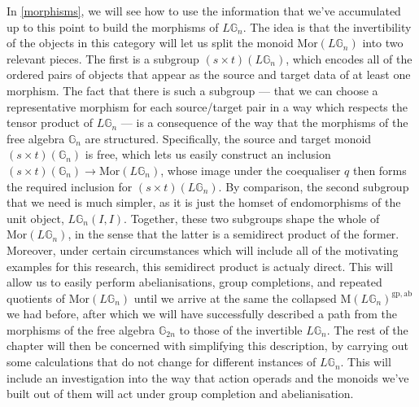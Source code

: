 In \cref{morphisms}, we will see how to use the information that we've accumulated up to this point to build the morphisms of $L\mathbb{G}_n$. The idea is that the invertibility of the objects in this category will let us split the monoid $\mathrm{Mor}(L\mathbb{G}_n)$ into two relevant pieces. The first is a subgroup $(s \times t)(L\mathbb{G}_n)$, which encodes all of the ordered pairs of objects that appear as the source and target data of at least one morphism. The fact that there is such a subgroup --- that we can choose a representative morphism for each source/target pair in a way which respects the tensor product of $L\mathbb{G}_n$ --- is a consequence of the way that the morphisms of the free algebra $\mathbb{G}_n$ are structured. Specifically, the source and target monoid $(s \times t)(\mathbb{G}_n)$ is free, which lets us easily construct an inclusion $(s \times t)(\mathbb{G}_n) \to \mathrm{Mor}(L\mathbb{G}_n)$, whose image under the coequaliser $q$ then forms the required inclusion for $(s \times t)(L\mathbb{G}_n)$. By comparison, the second subgroup that we need is much simpler, as it is just the homset of endomorphisms of the unit object, $L\mathbb{G}_n(I, I)$. Together, these two subgroups  shape the whole of $\mathrm{Mor}(L\mathbb{G}_n)$, in the sense that the latter is a semidirect product of the former. Moreover, under certain circumstances which will include all of the motivating examples for this research, this semidirect product is actualy direct. This will allow us to easily perform abelianisations, group completions, and repeated quotients of $\mathrm{Mor}(L\mathbb{G}_n)$ until we arrive at the same the collapsed $\mathrm{M}(L\mathbb{G}_n)^{\mathrm{gp}, \mathrm{ab}}$ we had before, after which we will have successfully described a path from the morphisms of the free algebra $\mathbb{G}_{2n}$ to those of the invertible $L\mathbb{G}_n$. The rest of the chapter will then be concerned with simplifying this description, by carrying out some calculations that do not change for different instances of $L\mathbb{G}_n$. This will include an investigation into the way that action operads and the monoids we've built out of them will act under group completion and abelianisation.

